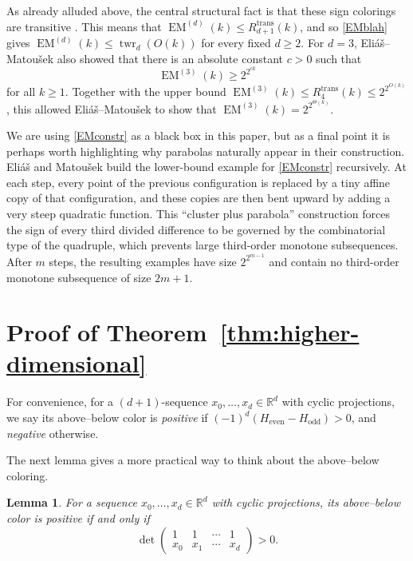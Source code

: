 \documentclass[11pt]{article}
\newtheorem{lemma}[theorem]{Lemma}
\newcommand{\twr}{\operatorname{twr}}
\begin{document}
As already alluded above, the central structural fact is that these sign colorings are transitive \cite[Lemma 2.5]{EM}. This means that $\operatorname{EM}^{(d)}(k)\le R_{d+1}^{\mathrm{trans}}(k)$, and so \eqref{EMblah} gives $\operatorname{EM}^{(d)}(k)\le \twr_d(O(k))$ for every fixed $d\ge 2$. For $d=3$, Eli\'a\v{s}--Matou\v{s}ek \cite[Theorem 1.5]{EM} also showed that there is an absolute constant $c>0$ such that
\begin{equation} \label{EMconstr}
\operatorname{EM}^{(3)}(k)\ge 2^{2^{ck}}
\end{equation}
for all $k\ge 1$. Together with the upper bound $\operatorname{EM}^{(3)}(k) \le R_4^{\mathrm{trans}}(k)\le 2^{2^{O(k)}}$, this allowed Eli\'a\v{s}--Matou\v{s}ek to show that $\operatorname{EM}^{(3)}(k)=2^{2^{\Theta(k)}}$. 

We are using \eqref{EMconstr} as a black box in this paper, but as a final point it is perhaps worth highlighting why parabolas naturally appear in their construction. Eli\'a\v{s} and Matou\v{s}ek build the lower-bound example for \eqref{EMconstr} recursively. At each step, every point of the previous configuration is replaced by a tiny affine copy of that configuration, and these copies are then bent upward by adding a very steep quadratic function. This ``cluster plus parabola'' construction forces the sign of every third divided difference to be governed by the combinatorial type of the quadruple, which prevents large third-order monotone subsequences. After $m$ steps, the resulting examples have size $2^{2^{m-1}}$ and contain no third-order monotone subsequence of size $2m+1$.

\section{Proof of Theorem~\ref{thm:higher-dimensional}}

For convenience, for a $(d+1)$-sequence $x_0,\ldots,x_d\in\mathbb R^d$ with
cyclic projections, we say its above--below color is \emph{positive} if
$(-1)^d(H_{\mathrm{even}}-H_{\mathrm{odd}})>0$, and \emph{negative} otherwise.

The next lemma gives a more practical way to think about the above--below
coloring.

\begin{lemma}\label{lem:color-det}
For a sequence $x_0,\ldots,x_d\in\mathbb R^d$ with cyclic projections, its
above--below color is positive if and only if
\[
\det
\begin{pmatrix}
1&1&\cdots&1\\
x_0&x_1&\cdots&x_d
\end{pmatrix}
>0.
\]
\end{lemma}
\end{document}

